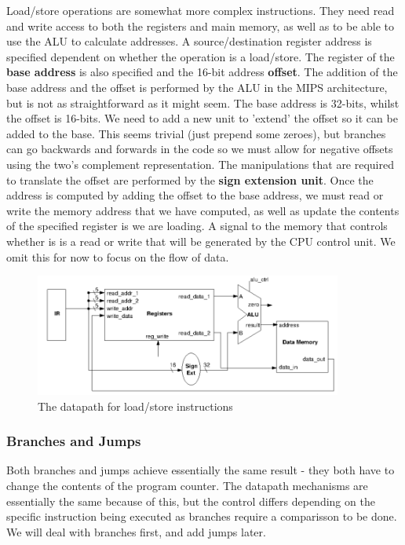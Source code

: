 \documentclass{article}
\begin{document}
	\par 
	Load/store operations are somewhat more complex instructions. They need read and write access to both the registers and main memory, as well as to be able to use the ALU to calculate addresses. A source/destination register address is specified dependent on whether the operation is a load/store. The register of the \textbf{base address} is also specified and the 16-bit address \textbf{offset}. The addition of the base address and the offset is performed by the ALU in the MIPS architecture, but is not as straightforward as it might seem. The base address is 32-bits, whilst the offset is 16-bits. We need to add a new unit to 'extend' the offset so it can be added to the base. This seems trivial (just prepend some zeroes), but branches can go backwards and forwards in the code so we must allow for negative offsets using the two's complement representation. The manipulations that are required to translate the offset are performed by the \textbf{sign extension unit}. Once the address is computed by adding the offset to the base address, we must read or write the memory address that we have computed, as well as update the contents of the specified register is we are loading. A signal to the memory that controls whether is is a read or write that will be generated by the CPU control unit. We omit this for now to focus on the flow of data.
	
	\begin{figure}[ht]
		\centering
		\includegraphics[width=0.9\textwidth]{load_store_instructions_datapath}
		\caption{The datapath for load/store instructions}
		\label{fig:load store instructions datapath}
	\end{figure}
	
	\subsubsection{Branches and Jumps}
	Both branches and jumps achieve essentially the same result - they both have to change the contents of the program counter. The datapath mechanisms are essentially the same because of this, but the control differs depending on the specific instruction being executed as branches require a comparisson to be done. We will deal with branches first, and add jumps later.
	
\end{document}
